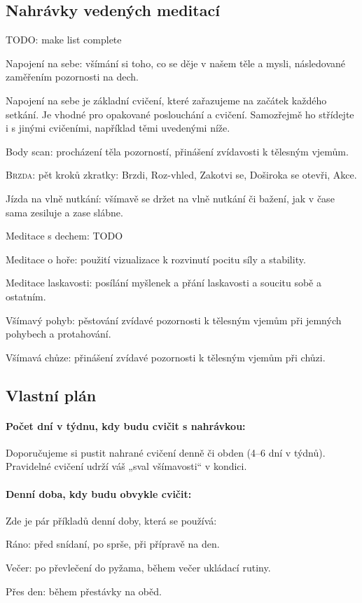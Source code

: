 	\subsection{Nahrávky vedených meditací}
		TODO: make list complete
		\begin{description*}
			\item[Napojení na sebe:] všímání si toho, co se děje v našem těle a mysli, následované zaměřením pozornosti na dech. \par Napojení na sebe je základní cvičení, které zařazujeme na začátek každého setkání. Je vhodné pro opakované poslouchání a cvičení. Samozřejmě ho střídejte i s jinými cvičeními, například těmi uvedenými níže.
			\item[Body scan:] procházení těla pozorností, přinášení zvídavosti k tělesným vjemům.
			\item[\textsc{Brzda}:] pět kroků zkratky: Brzdi, Roz-vhled, Zakotvi se, Doširoka se otevři, Akce.
			\item[Jízda na vlně nutkání:] všímavě se držet na vlně nutkání či bažení, jak v čase sama zesiluje a zase slábne.
			\item[Meditace s dechem:] TODO
			\item[Meditace o hoře:] použití vizualizace k rozvinutí pocitu síly a stability.
			\item[Meditace laskavosti:] posílání myšlenek a přání laskavosti a soucitu sobě a ostatním.
			\item[Všímavý pohyb:] pěstování zvídavé pozornosti k tělesným vjemům při jemných pohybech a protahování.
			\item[Všímavá chůze:] přinášení zvídavé pozornosti k tělesným vjemům při chůzi.
		\end{description*}


	\clearpage
	\subsection{Vlastní plán \normalPencilLeftDown}
		\paragraph{Počet dní v týdnu, kdy budu cvičit s nahrávkou:} \par Doporučujeme si pustit nahrané cvičení denně či obden (4–6 dní v týdnů). Pravidelné cvičení udrží váš „sval všímavosti“ v kondici.
		\paragraph{Denní doba, kdy budu obvykle cvičit:}  \par Zde je pár příkladů denní doby, která se používá:
			\begin{enumerate*}
				\item Ráno: před snídaní, po sprše, při přípravě na den.
				\item Večer: po převlečení do pyžama, během večer ukládací rutiny.
				\item Přes den: během přestávky na oběd.
			\end{enumerate*}

